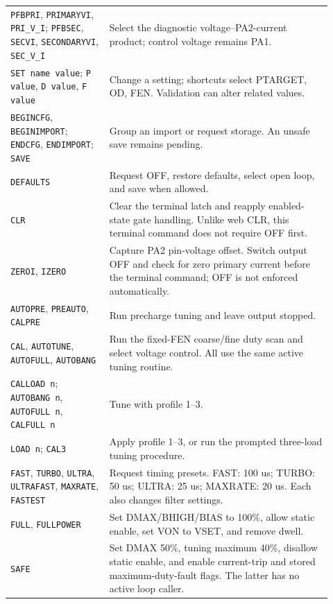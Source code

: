 \begin{longtable}{@{}L{0.29\linewidth}L{0.63\linewidth}@{}}
\texttt{PFBPRI}, \texttt{PRIMARYVI}, \texttt{PRI\_V\_I}; \texttt{PFBSEC}, \texttt{SECVI}, \texttt{SECONDARYVI}, \texttt{SEC\_V\_I} & Select the diagnostic voltage--PA2-current product; control voltage remains PA1.\\
\texttt{SET name value}; \texttt{P value}, \texttt{D value}, \texttt{F value} & Change a setting; shortcuts select PTARGET, OD, FEN. Validation can alter related values.\\
\texttt{BEGINCFG}, \texttt{BEGINIMPORT}; \texttt{ENDCFG}, \texttt{ENDIMPORT}; \texttt{SAVE} & Group an import or request storage. An unsafe save remains pending.\\
\texttt{DEFAULTS} & Request OFF, restore defaults, select open loop, and save when allowed.\\
\texttt{CLR} & Clear the terminal latch and reapply enabled-state gate handling. Unlike web CLR, this terminal command does not require OFF first.\\
\texttt{ZEROI}, \texttt{IZERO} & Capture PA2 pin-voltage offset. Switch output OFF and check for zero primary current before the terminal command; OFF is not enforced automatically.\\
\texttt{AUTOPRE}, \texttt{PREAUTO}, \texttt{CALPRE} & Run precharge tuning and leave output stopped.\\
\texttt{CAL}, \texttt{AUTOTUNE}, \texttt{AUTOFULL}, \texttt{AUTOBANG} & Run the fixed-FEN coarse/fine duty scan and select voltage control. All use the same active tuning routine.\\
\texttt{CALLOAD n}; \texttt{AUTOBANG n}, \texttt{AUTOFULL n}, \texttt{CALFULL n} & Tune with profile 1--3.\\
\texttt{LOAD n}; \texttt{CAL3} & Apply profile 1--3, or run the prompted three-load tuning procedure.\\
\texttt{FAST}, \texttt{TURBO}, \texttt{ULTRA}, \texttt{ULTRAFAST}, \texttt{MAXRATE}, \texttt{FASTEST} & Request timing presets. FAST: 100 us; TURBO: 50 us; ULTRA: 25 us; MAXRATE: 20 us. Each also changes filter settings.\\
\texttt{FULL}, \texttt{FULLPOWER} & Set DMAX/BHIGH/BIAS to 100\%, allow static enable, set VON to VSET, and remove dwell.\\
\texttt{SAFE} & Set DMAX 50\%, tuning maximum 40\%, disallow static enable, and enable current-trip and stored maximum-duty-fault flags. The latter has no active loop caller.\\
\bottomrule
\end{longtable}
\endgroup

